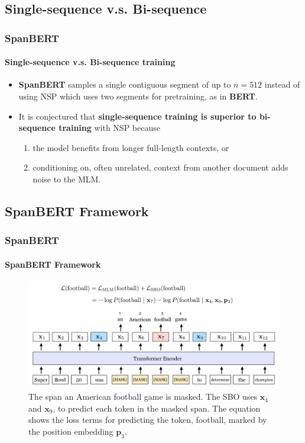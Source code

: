 \documentclass[12pt]{beamer}
\begin{document}
	\subsection{Single-sequence v.s. Bi-sequence}
	\begin{frame}
		\frametitle{SpanBERT}
		\framesubtitle{Single-sequence v.s. Bi-sequence training}
		
		\begin{itemize}
			\item \textbf{SpanBERT} samples a single contiguous segment of up to $n = 512$ instead of using NSP which uses two segments for pretraining, as in \textbf{BERT}. \newline
			
			\item It is conjectured that \textbf{single-sequence training is superior to bi-sequence training} with NSP because
			\begin{enumerate}
				\item the model benefits from longer full-length contexts, or 
				\item conditioning on, often unrelated, context from another document adds noise to the MLM.
			\end{enumerate}
		\end{itemize}
		
	\end{frame}
	
	\subsection{SpanBERT Framework}
	\begin{frame}
		\frametitle{SpanBERT}
		\framesubtitle{SpanBERT Framework}
		
		\begin{figure}
			\centering
			\includegraphics[width=.93\textwidth]{spanbert.png}
			\caption{ The span \textcolor{myyellow}{an American football game} is masked. The SBO uses \textcolor{myblue}{$\mathbf{\textbf{x}}_{4}$} and \textcolor{myblue}{$\mathbf{\textbf{x}}_{9}$}, to predict each token in the masked span. The equation shows the loss terms for predicting the token, \textcolor{mypink}{football}, marked by the position embedding $\mathbf{\textbf{p}}_{3}$.}
		\end{figure}
		
	\end{frame}
	
\end{document}
